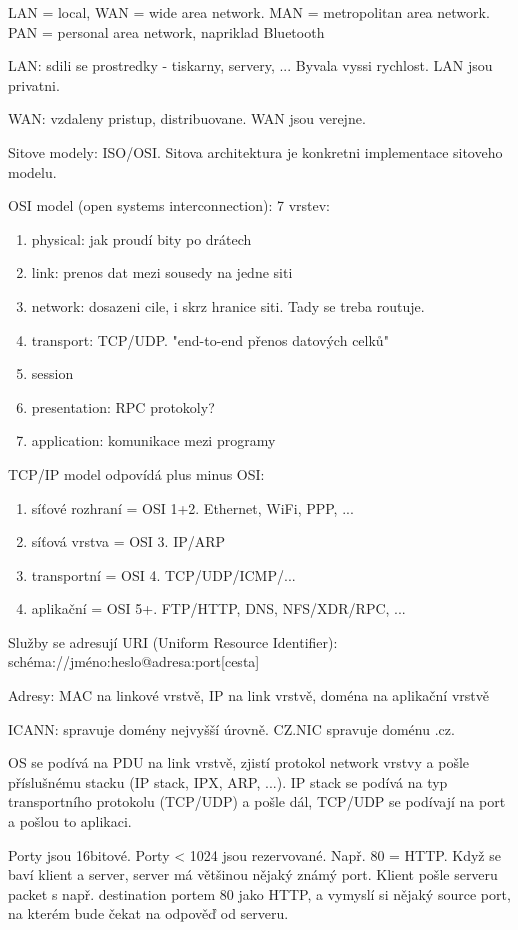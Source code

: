 \documentclass[a4paper,10pt,titlepage]{article} \usepackage[utf8]{inputenc}
\begin{document}
 \pagestyle{empty}

LAN = local, WAN = wide area network. MAN = metropolitan area network.
PAN = personal area network, napriklad Bluetooth

LAN: sdili se prostredky - tiskarny, servery, ...
Byvala vyssi rychlost.
LAN jsou privatni.

WAN: vzdaleny pristup, distribuovane.
WAN jsou verejne.

Sitove modely: ISO/OSI. Sitova architektura je konkretni implementace sitoveho
modelu.

OSI model (open systems interconnection): 7 vrstev:
\begin{enumerate}
\item physical: jak proudí bity po drátech
\item link: prenos dat mezi sousedy na jedne siti
\item network: dosazeni cile, i skrz hranice siti. Tady se treba routuje.
\item transport: TCP/UDP. "end-to-end přenos datových celků"
\item session
\item presentation: RPC protokoly?
\item application: komunikace mezi programy
\end{enumerate}

TCP/IP model odpovídá plus minus OSI:
\begin{enumerate}
\item síťové rozhraní = OSI 1+2. Ethernet, WiFi, PPP, ...
\item síťová vrstva = OSI 3. IP/ARP
\item transportní = OSI 4. TCP/UDP/ICMP/...
\item aplikační = OSI 5+. FTP/HTTP, DNS, NFS/XDR/RPC, ...
\end{enumerate}

Služby se adresují URI (Uniform Resource Identifier):
schéma://jméno:heslo@adresa:port[cesta]

Adresy: MAC na linkové vrstvě, IP na link vrstvě, doména na aplikační vrstvě

ICANN: spravuje domény nejvyšší úrovně.
CZ.NIC spravuje doménu .cz.

OS se podívá na PDU na link vrstvě, zjistí protokol network vrstvy a pošle
příslušnému stacku (IP stack, IPX, ARP, ...).
IP stack se podívá na typ transportního protokolu (TCP/UDP) a pošle dál,
TCP/UDP se podívají na port a pošlou to aplikaci.

Porty jsou 16bitové. Porty < 1024 jsou rezervované. Např. 80 = HTTP.
Když se baví klient a server, server má většinou nějaký známý port.
Klient pošle serveru packet s např. destination portem 80 jako HTTP,
a vymyslí si nějaký source port, na kterém bude čekat na odpověď od serveru.
\end{document}
